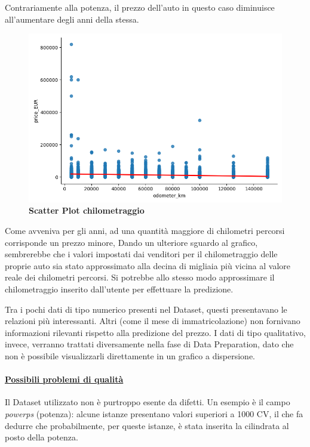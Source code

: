 Contrariamente alla potenza, il prezzo dell'auto in questo caso diminuisce all'aumentare degli anni della stessa.

\begin{figure}[H]
    \centering
    \includegraphics[scale=0.45]{Immagini/chilometraggio}
    \caption{\textbf{Scatter Plot chilometraggio}}
    \label{fig:odometer_km}
\end{figure}

Come avveniva per gli anni, ad una quantità maggiore di chilometri percorsi corrisponde un prezzo minore,
Dando un ulteriore sguardo al grafico, sembrerebbe che i valori impostati dai venditori per il chilometraggio delle proprie auto sia stato approssimato alla decina di migliaia più vicina al valore reale dei chilometri percorsi. Si potrebbe allo stesso modo approssimare il chilometraggio inserito dall'utente per effettuare la predizione.

Tra i pochi dati di tipo numerico presenti nel Dataset, questi presentavano le relazioni più interessanti. Altri (come il mese di immatricolazione) non fornivano informazioni rilevanti rispetto alla predizione del prezzo. I dati di tipo qualitativo, invece, verranno trattati diversamente nella fase di Data Preparation, dato che non è possibile visualizzarli direttamente in un grafico a dispersione.
\pagebreak

\paragraph{\textcolor[HTML]{000099}{\underline{Possibili problemi di qualità}}}
Il Dataset utilizzato non è purtroppo esente da difetti. Un esempio è il campo \textit{power\textunderscore ps} (potenza): alcune istanze presentano valori superiori a 1000 CV, il che fa dedurre che probabilmente, per queste istanze, è stata inserita la cilindrata al posto della potenza. 

